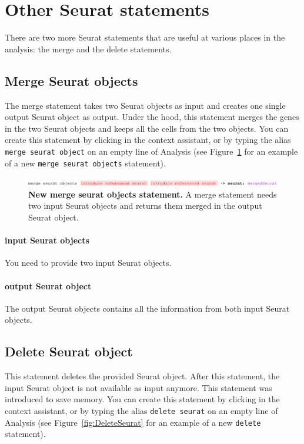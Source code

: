 \section{Other Seurat statements}\label{sec:OtherSeuratStatements}
There are two more Seurat statements that are useful at various places in the analysis: the
merge and the delete statements.

\subsection{Merge Seurat objects}
The merge statement takes two Seurat objects as input and creates one single output Seurat
object as output. Under the hood, this statement merges the genes in the two Seurat objects
and keeps all the cells from the two objects.
You can create this statement by clicking  in the context assistant, or by typing
the alias \texttt{merge seurat object} on an empty line of Analysis (see Figure~\ref{fig:MergeSeurat}
for an example of a new \texttt{merge seurat objects} statement).

\begin{figure}[h!tbp]
  \centering
    \includegraphics[width=\figWidthWide]{figures/MergeSeurat.pdf}
    \caption[New merge seurat objects statement.]{\textbf{New merge seurat objects statement.} A merge statement
    needs two input Seurat objects and returns them merged in the output Seurat object.}
\label{fig:MergeSeurat}
\end{figure}

\paragraph{input Seurat objects} You need to provide two input Seurat objects.

\paragraph{output Seurat object} The output Seurat objects contains all the information
from both input Seurat objects.

\subsection{Delete Seurat object}
This statement deletes the provided Seurat object. After this statement, the input Seurat
object is not available as input anymore. This statement was introduced to save memory.
You can create this statement by clicking
 in the context assistant, or by typing
the alias \texttt{delete seurat} on an empty line of Analysis (see Figure~\ref{fig:DeleteSeurat}
for an example of a new \texttt{delete} statement).

